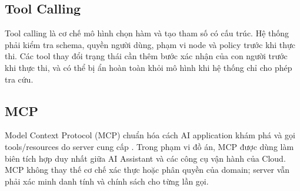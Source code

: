 \subsection{Tool Calling}

Tool calling là cơ chế mô hình chọn hàm và tạo tham số có cấu trúc. Hệ thống phải
kiểm tra schema, quyền người dùng, phạm vi node và policy trước khi thực thi. Các
tool thay đổi trạng thái cần thêm bước xác nhận của con người trước khi thực thi,
và có thể bị ẩn hoàn toàn khỏi mô hình khi hệ thống chỉ cho phép tra cứu.

\subsection{MCP}

Model Context Protocol (MCP) chuẩn hóa cách AI application khám phá và gọi
tools/resources do server cung cấp \cite{mcp}. Trong phạm vi đồ án, MCP được
dùng làm biên tích hợp duy nhất giữa AI Assistant và các công cụ vận hành của Cloud. MCP không thay thế cơ chế xác
thực hoặc phân quyền của domain; server vẫn phải xác minh danh tính và chính
sách cho từng lần gọi.
